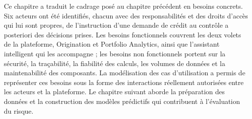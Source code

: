 Ce chapitre a traduit le cadrage posé au chapitre précédent en besoins concrets. Six acteurs ont été identifiés, chacun avec des responsabilités et des droits d'accès qui lui sont propres, de l'instruction d'une demande de crédit au contrôle a posteriori des décisions prises. Les besoins fonctionnels couvrent les deux volets de la plateforme, Origination et Portfolio Analytics, ainsi que l'assistant intelligent qui les accompagne ; les besoins non fonctionnels portent sur la sécurité, la traçabilité, la fiabilité des calculs, les volumes de données et la maintenabilité des composants. La modélisation des cas d'utilisation a permis de représenter ces besoins sous la forme des interactions réellement autorisées entre les acteurs et la plateforme. Le chapitre suivant aborde la préparation des données et la construction des modèles prédictifs qui contribuent à l'évaluation du risque.
